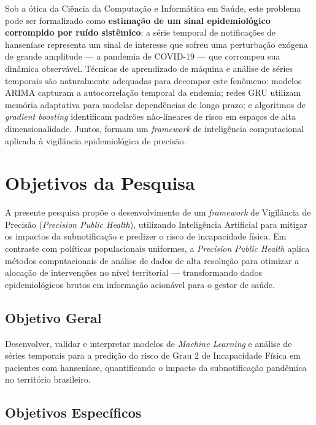Sob a ótica da Ciência da Computação e Informática em Saúde, este problema pode ser formalizado como \textbf{estimação de um sinal epidemiológico corrompido por ruído sistêmico}: a série temporal de notificações de hanseníase representa um sinal de interesse que sofreu uma perturbação exógena de grande amplitude — a pandemia de COVID-19 — que corrompeu sua dinâmica observável. Técnicas de aprendizado de máquina e análise de séries temporais são naturalmente adequadas para decompor este fenômeno: modelos ARIMA capturam a autocorrelação temporal da endemia; redes GRU utilizam memória adaptativa para modelar dependências de longo prazo; e algoritmos de \textit{gradient boosting} identificam padrões não-lineares de risco em espaços de alta dimensionalidade. Juntos, formam um \textit{framework} de inteligência computacional aplicada à vigilância epidemiológica de precisão.

\section{Objetivos da Pesquisa}

A presente pesquisa propõe o desenvolvimento de um \textit{framework} de Vigilância de Precisão (\textit{Precision Public Health}), utilizando Inteligência Artificial para mitigar os impactos da subnotificação e predizer o risco de incapacidade física. Em contraste com políticas populacionais uniformes, a \textit{Precision Public Health} aplica métodos computacionais de análise de dados de alta resolução para otimizar a alocação de intervenções no nível territorial \cite{who_hans_2021} — transformando dados epidemiológicos brutos em informação acionável para o gestor de saúde.

\subsection{Objetivo Geral}

Desenvolver, validar e interpretar modelos de \textit{Machine Learning} e análise de séries temporais para a predição do risco de Grau 2 de Incapacidade Física em pacientes com hanseníase, quantificando o impacto da subnotificação pandêmica no território brasileiro.

\subsection{Objetivos Específicos}

